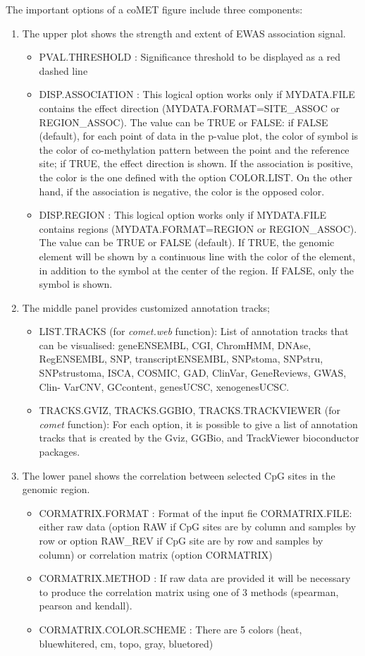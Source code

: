 \documentclass[11pt]{article}\usepackage[]{graphicx}\usepackage[usenames,dvipsnames]{color}
\begin{document}
 The important options of a coMET figure include three components:
\begin{enumerate}
  \item The upper plot shows the strength and extent of EWAS association signal. 
   \begin{itemize}
      \item PVAL.THRESHOLD : Significance threshold to be displayed as a red dashed line
      \item DISP.ASSOCIATION : This logical option works only if MYDATA.FILE contains the effect direction (MYDATA.FORMAT=SITE\_ASSOC or REGION\_ASSOC). The value can be TRUE or FALSE: if FALSE (default), for each point of data in the p-value plot, the color of symbol is the color of co-methylation pattern between the point and the reference site; if TRUE, the effect direction is shown. If the association is positive, the color is the one defined with the option COLOR.LIST. On the other hand, if the association is negative, the color is the opposed color. 
      \item DISP.REGION : This logical option works only if MYDATA.FILE contains regions (MYDATA.FORMAT=REGION or REGION\_ASSOC). The value can be TRUE or FALSE (default). If TRUE, the genomic element will be shown by a continuous line with the color of the element, in addition to the symbol at the center of the region. If FALSE, only the symbol is shown.
  \end{itemize}
  
  \item The middle panel provides customized annotation tracks; 
     \begin{itemize}
     \item LIST.TRACKS (for \emph{comet.web} function): List of annotation tracks that can be visualised: geneENSEMBL, CGI, ChromHMM, DNAse, RegENSEMBL, SNP, transcriptENSEMBL, SNPstoma, SNPstru, SNPstrustoma, ISCA, COSMIC, GAD, ClinVar, GeneReviews, GWAS, Clin- VarCNV, GCcontent, genesUCSC, xenogenesUCSC. 
     \item TRACKS.GVIZ, TRACKS.GGBIO, TRACKS.TRACKVIEWER (for \emph{comet} function): For each option, it is possible to give a list of annotation tracks that is created by the Gviz, GGBio, and TrackViewer bioconductor packages. 
     \end{itemize}

  \item The lower panel shows the correlation between selected CpG sites in the genomic region.
    \begin{itemize}
      \item CORMATRIX.FORMAT : Format of the input fie CORMATRIX.FILE: either raw data (option RAW if CpG sites are by column and samples by row or option RAW\_REV if CpG site are by row and samples by column) or correlation matrix (option CORMATRIX) 
      \item CORMATRIX.METHOD : If raw data are provided it will be necessary to produce the correlation matrix using one of 3 methods (spearman, pearson and kendall). 
      \item CORMATRIX.COLOR.SCHEME : There are 5 colors (heat, bluewhitered, cm, topo, gray, bluetored)
   \end{itemize}


\end{enumerate}
\end{document}
